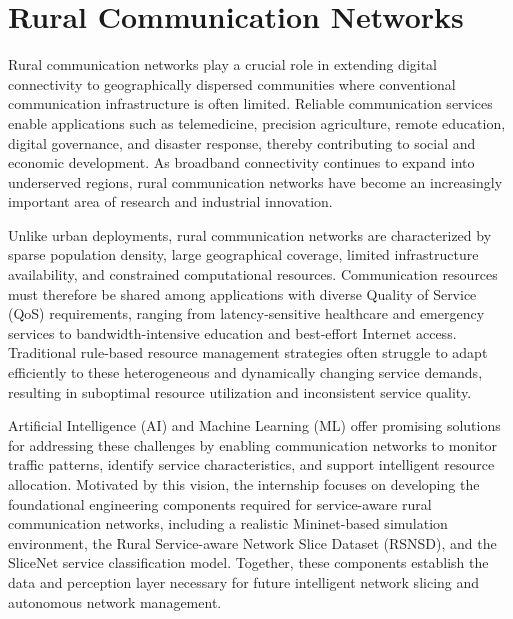 \documentclass[12pt,a4paper]{report}
\begin{document}
	\section{Rural Communication Networks}
	\label{sec:rural}
	
	Rural communication networks play a crucial role in extending digital connectivity to geographically dispersed communities where conventional communication infrastructure is often limited. Reliable communication services enable applications such as telemedicine, precision agriculture, remote education, digital governance, and disaster response, thereby contributing to social and economic development. As broadband connectivity continues to expand into underserved regions, rural communication networks have become an increasingly important area of research and industrial innovation.
	
	Unlike urban deployments, rural communication networks are characterized by sparse population density, large geographical coverage, limited infrastructure availability, and constrained computational resources. Communication resources must therefore be shared among applications with diverse Quality of Service (QoS) requirements, ranging from latency-sensitive healthcare and emergency services to bandwidth-intensive education and best-effort Internet access. Traditional rule-based resource management strategies often struggle to adapt efficiently to these heterogeneous and dynamically changing service demands, resulting in suboptimal resource utilization and inconsistent service quality.
	
	Artificial Intelligence (AI) and Machine Learning (ML) offer promising solutions for addressing these challenges by enabling communication networks to monitor traffic patterns, identify service characteristics, and support intelligent resource allocation. Motivated by this vision, the internship focuses on developing the foundational engineering components required for service-aware rural communication networks, including a realistic Mininet-based simulation environment, the Rural Service-aware Network Slice Dataset (RSNSD), and the SliceNet service classification model. Together, these components establish the data and perception layer necessary for future intelligent network slicing and autonomous network management.
	
	
	
	
\end{document}
